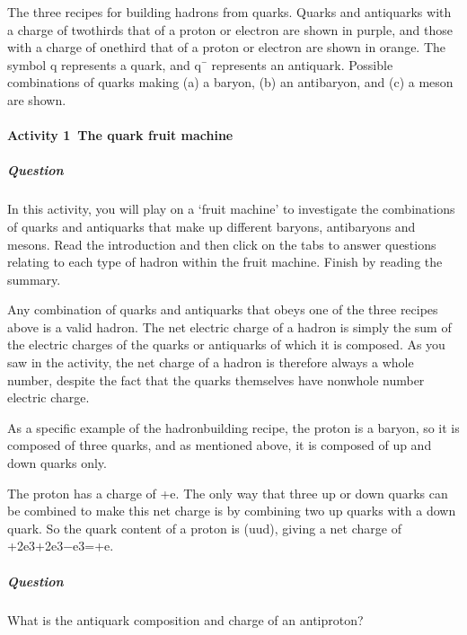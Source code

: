 \documentclass[letterpaper,10pt,english]{sphinxmanual}
\let\sphinxpxdimen\pdfpxdimen\else\newdimen\sphinxpxdimen
\begin{document}
\sphinxincludegraphics[width=187\sphinxpxdimen,height=528\sphinxpxdimen]{{sm123_t06_p03_f01.eps}.jpg}

 The three recipes for building hadrons from quarks. Quarks and antiquarks with a charge of two\sphinxhyphen{}thirds that of a proton or electron are shown in purple, and those with a charge of one\sphinxhyphen{}third that of a proton or electron are shown in orange. The symbol q represents a quark, and q¯ represents an antiquark. Possible combinations of quarks making (a) a baryon, (b) an antibaryon, and (c) a meson are shown.


\paragraph{Activity 1 The quark fruit machine}
\label{\detokenize{content/session_00/Part_00_04:Activity-1_xa0The-quark-fruit-machine}}


\subparagraph{Question}
\label{\detokenize{content/session_00/Part_00_04:Question}}
In this activity, you will play on a ‘fruit machine’ to investigate the combinations of quarks and antiquarks that make up different baryons, antibaryons and mesons. Read the introduction and then click on the tabs to answer questions relating to each type of hadron within the fruit machine. Finish by reading the summary.

Any combination of quarks and antiquarks that obeys one of the three recipes above is a valid hadron. The net electric charge of a hadron is simply the sum of the electric charges of the quarks or antiquarks of which it is composed. As you saw in the activity, the net charge of a hadron is therefore always a whole number, despite the fact that the quarks themselves have non\sphinxhyphen{}whole number electric charge.

As a specific example of the hadron\sphinxhyphen{}building recipe, the proton is a baryon, so it is composed of three quarks, and as mentioned above, it is composed of up and down quarks only.

The proton has a charge of +e. The only way that three up or down quarks can be combined to make this net charge is by combining two up quarks with a down quark. So the quark content of a proton is (uud), giving a net charge of +2e3+2e3−e3=+e.


\subparagraph{Question}
\label{\detokenize{content/session_00/Part_00_04:id1}}
What is the antiquark composition and charge of an antiproton?
\end{document}

